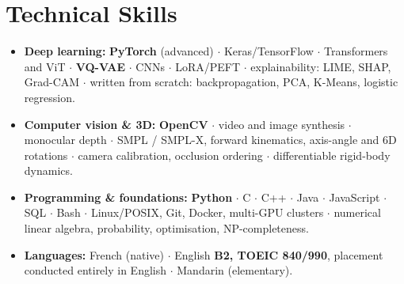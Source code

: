 \documentclass[10pt, letterpaper]{article}
\begin{document}
\section{Technical Skills}
\begin{itemize}
    \item \textbf{Deep learning:} \textbf{PyTorch} (advanced) $\cdot$ Keras/TensorFlow $\cdot$ Transformers and ViT $\cdot$ \textbf{VQ-VAE} $\cdot$ CNNs $\cdot$ LoRA/PEFT $\cdot$ explainability: LIME, SHAP, Grad-CAM $\cdot$ written from scratch: backpropagation, PCA, K-Means, logistic regression.
    \item \textbf{Computer vision \& 3D:} \textbf{OpenCV} $\cdot$ video and image synthesis $\cdot$ monocular depth $\cdot$ SMPL / SMPL-X, forward kinematics, axis-angle and 6D rotations $\cdot$ camera calibration, occlusion ordering $\cdot$ differentiable rigid-body dynamics.
    \item \textbf{Programming \& foundations:} \textbf{Python} $\cdot$ C $\cdot$ C++ $\cdot$ Java $\cdot$ JavaScript $\cdot$ SQL $\cdot$ Bash $\cdot$ Linux/POSIX, Git, Docker, multi-GPU clusters $\cdot$ numerical linear algebra, probability, optimisation, NP-completeness.
    \item \textbf{Languages:} French (native) $\cdot$ English \textbf{B2, TOEIC 840/990}, placement conducted entirely in English $\cdot$ Mandarin (elementary).
\end{itemize}
\end{document}
